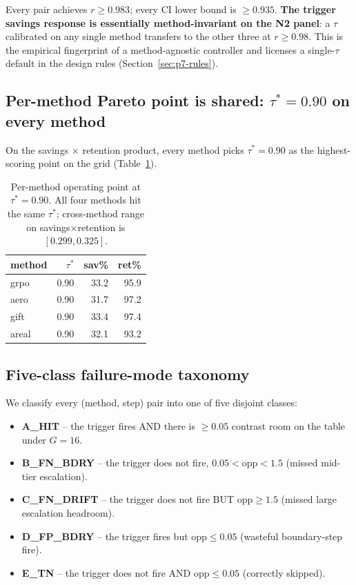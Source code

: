Every pair achieves $r \ge 0.983$; every CI lower bound is $\ge 0.935$.
\textbf{The trigger savings response is essentially method-invariant on the
N2 panel}: a $\tau$ calibrated on any single method transfers to the other
three at $r \ge 0.98$.  This is the empirical fingerprint of a method-agnostic
controller and licenses a single-$\tau$ default in the design rules
(Section~\ref{sec:p7-rules}).

\subsection{Per-method Pareto point is shared: $\tau^*{=}0.90$ on every method}

On the savings $\times$ retention product, every method picks
$\tau^*{=}0.90$ as the highest-scoring point on the grid
(Table~\ref{tab:p7-iter107-pareto}).

\begin{table}[t]
\centering\small
\caption{Per-method operating point at $\tau^*{=}0.90$.  All four methods
hit the same $\tau^*$; cross-method range on savings$\times$retention is
$[0.299, 0.325]$.}
\label{tab:p7-iter107-pareto}
\vspace{2pt}
\begin{tabular}{lrrr}
\toprule
method & $\tau^*$ & sav\% & ret\% \\
\midrule
grpo  & 0.90 & 33.2 & 95.9 \\
aero  & 0.90 & 31.7 & 97.2 \\
gift  & 0.90 & 33.4 & 97.4 \\
areal & 0.90 & 32.1 & 93.2 \\
\bottomrule
\end{tabular}
\end{table}

\subsection{Five-class failure-mode taxonomy}

We classify every (method, step) pair into one of five disjoint classes:

\begin{itemize}
\item \textbf{A\_HIT} -- the trigger fires AND there is $\ge 0.05$ contrast
room on the table under $G{=}16$.
\item \textbf{B\_FN\_BDRY} -- the trigger does not fire, $0.05 < \mathrm{opp} < 1.5$
(missed mid-tier escalation).
\item \textbf{C\_FN\_DRIFT} -- the trigger does not fire BUT $\mathrm{opp} \ge 1.5$
(missed large escalation headroom).
\item \textbf{D\_FP\_BDRY} -- the trigger fires but $\mathrm{opp} \le 0.05$
(wasteful boundary-step fire).
\item \textbf{E\_TN} -- the trigger does not fire AND $\mathrm{opp} \le 0.05$
(correctly skipped).
\end{itemize}

